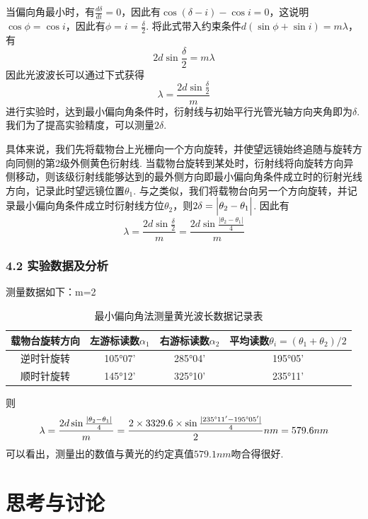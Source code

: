 \documentclass[UTF8]{ctexart}
\begin{document}
当偏向角最小时，有$\displaystyle{\frac{d\delta}{di}=0}$，因此有$\cos(\delta-i)-\cos i=0$，这说明$\cos\phi=\cos i$，因此有$\phi=i=\frac{\delta}{2}$. 将此式带入约束条件$d(\sin \phi+\sin i)=m\lambda$，有
\begin{equation}
    2d\sin\frac{\delta}{2}=m\lambda
\end{equation}
因此光波波长可以通过下式获得
\begin{equation}
    \lambda=\frac{2d\sin\frac{\delta}{2}}{m}
\end{equation}
进行实验时，达到最小偏向角条件时，衍射线与初始平行光管光轴方向夹角即为$\delta$. 我们为了提高实验精度，可以测量$2\delta$.\par
具体来说，我们先将载物台上光栅向一个方向旋转，并使望远镜始终追随与旋转方向同侧的第2级外侧黄色衍射线. 当载物台旋转到某处时，衍射线将向旋转方向异侧移动，则该级衍射线能够达到的最外侧方向即最小偏向角条件成立时的衍射光线方向，记录此时望远镜位置$\theta_1$. 与之类似，我们将载物台向另一个方向旋转，并记录最小偏向角条件成立时衍射线方位$\theta_2$，则$2\delta=\Big{|}\theta_2-\theta_1\Big{|}$. 因此有
\begin{equation}
    \lambda=\frac{2d\sin\frac{\delta}{2}}{m}=\frac{2d\sin\frac{|\theta_2-\theta_1|}{4}}{m}
\end{equation}

\subsubsection*{4.2 实验数据及分析}
测量数据如下：m=2
\begin{table}[H]\begin{center}
    \caption{最小偏向角法测量黄光波长数据记录表}
    \begin{tabular}{|c|c|c|c|}
        \hline
        载物台旋转方向&左游标读数$\alpha_1$&右游标读数$\alpha_2$&平均读数$\theta_i=(\theta_1+\theta_2)/2$\\
        \hline
        逆时针旋转&105°07'&285°04'&195°05'\\
        \hline
        顺时针旋转&145°12'&325°10'&235°11'\\
        \hline        
    \end{tabular}
\end{center}\end{table}
则\[\lambda=\frac{2d\sin\frac{|\theta_2-\theta_1|}{4}}{m}=\frac{2\times3329.6\times\sin\frac{|235\degree11'-195\degree05'|}{4}}{2}nm=579.6nm\]
可以看出，测量出的数值与黄光的约定真值$579.1nm$吻合得很好.

\section{思考与讨论}
\end{document}
